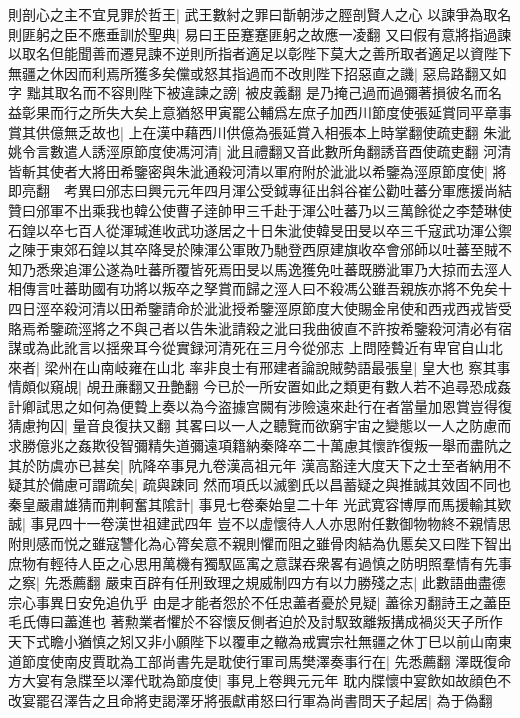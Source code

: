 則剖心之主不宜見罪於哲王|{
	武王數紂之罪曰斮朝涉之脛剖賢人之心}
以諫爭為取名則匪躬之臣不應垂訓於聖典|{
	易曰王臣蹇蹇匪躬之故應一凌翻}
又曰假有意將指過諫以取名但能聞善而遷見諫不逆則所指者適足以彰陛下莫大之善所取者適足以資陛下無疆之休因而利焉所獲多矣儻或怒其指過而不改則陛下招惡直之譏|{
	惡烏路翻又如字}
黜其取名而不容則陛下被違諫之謗|{
	被皮義翻}
是乃掩己過而過彌著損彼名而名益彰果而行之所失大矣上意猶怒甲寅罷公輔爲左庶子加西川節度使張延賞同平章事賞其供億無乏故也|{
	上在漢中藉西川供億為張延賞入相張本上時掌翻使疏吏翻}
朱泚姚令言數遣人誘涇原節度使馮河清|{
	泚且禮翻又音此數所角翻誘音酉使疏吏翻}
河清皆斬其使者大將田希鑒密與朱泚通殺河清以軍府附於泚泚以希鑒為涇原節度使|{
	將即亮翻　考異曰邠志曰興元元年四月渾公受鉞專征出斜谷崔公勸吐蕃分軍應援尚結贊曰邠軍不出乘我也韓公使曹子逹帥甲三千赴于渾公吐蕃乃以三萬餘從之李楚琳使石鍠以卒七百人從渾瑊進收武功遂居之十日朱泚使韓旻田旻以卒三千寇武功渾公禦之陳于東郊石鍠以其卒降旻於陳渾公軍敗乃馳登西原建旗收卒會邠師以吐蕃至賊不知乃悉衆追渾公遂為吐蕃所覆皆死焉田旻以馬逸獲免吐蕃既勝泚軍乃大掠而去涇人相傳言吐蕃助國有功將以叛卒之孥賞而歸之涇人曰不殺馮公雖吾親族亦將不免矣十四日涇卒殺河清以田希鑒請命於泚泚授希鑒涇原節度大使賜金帛使和西戎西戎皆受賂焉希鑒疏涇將之不與己者以告朱泚請殺之泚曰我曲彼直不許按希鑒殺河清必有宿謀或為此訛言以揺衆耳今從實録河清死在三月今從邠志}
上問陸䞇近有卑官自山北來者|{
	梁州在山南岐雍在山北}
率非良士有邢建者論說賊勢語最張皇|{
	皇大也}
察其事情頗似窺覘|{
	覘丑亷翻又丑艶翻}
今已於一所安置如此之類更有數人若不追尋恐成姦計卿試思之如何為便䞇上奏以為今盗據宫闕有涉險遠來赴行在者當量加恩賞豈得復猜慮拘囚|{
	量音良復扶又翻}
其畧曰以一人之聽覽而欲窮宇宙之變態以一人之防慮而求勝億兆之姦欺役智彌精失道彌遠項籍納秦降卒二十萬慮其懷詐復叛一舉而盡阬之其於防虞亦已甚矣|{
	阬降卒事見九卷漢高祖元年}
漢高豁逹大度天下之士至者納用不疑其於備慮可謂疏矣|{
	疏與踈同}
然而項氏以滅劉氏以昌蓄疑之與推誠其效固不同也秦皇嚴肅雄猜而荆軻奮其隂計|{
	事見七卷秦始皇二十年}
光武寛容博厚而馬援輸其欵誠|{
	事見四十一卷漢世祖建武四年}
豈不以虚懷待人人亦思附任數御物物終不親情思附則感而悦之雖寇讐化為心膂矣意不親則懼而阻之雖骨肉結為仇慝矣又曰陛下智出庶物有輕待人臣之心思用萬機有獨馭區㝢之意謀吞衆畧有過慎之防明照羣情有先事之察|{
	先悉薦翻}
嚴束百辟有任刑致理之規威制四方有以力勝殘之志|{
	此數語曲盡德宗心事異日安免追仇乎}
由是才能者怨於不任忠藎者憂於見疑|{
	藎徐刃翻詩王之藎臣毛氏傳曰藎進也}
著勲業者懼於不容懷反側者迫於及討馭致離叛搆成禍災天子所作天下式瞻小猶慎之矧又非小願陛下以覆車之轍為戒實宗社無疆之休丁巳以前山南東道節度使南皮賈耽為工部尚書先是耽使行軍司馬樊澤奏事行在|{
	先悉薦翻}
澤既復命方大宴有急牒至以澤代耽為節度使|{
	事見上卷興元元年}
耽内牒懷中宴飲如故顔色不改宴罷召澤告之且命將吏謁澤牙將張獻甫怒曰行軍為尚書問天子起居|{
	為于偽翻}
